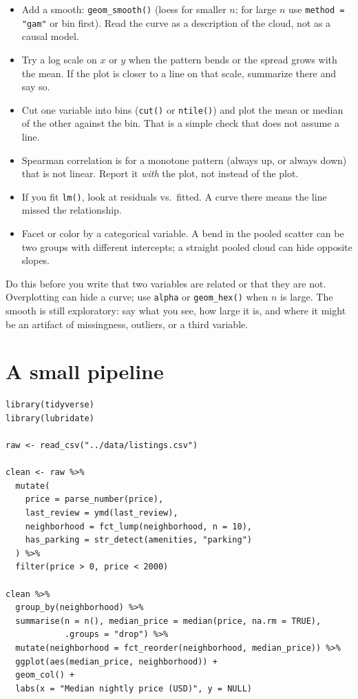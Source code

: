 \documentclass[11pt, a4paper]{article}
\begin{document}
\begin{itemize}
    \item Add a smooth: \texttt{geom\_smooth()} (loess for smaller $n$; for large $n$ use \texttt{method = "gam"} or bin first). Read the curve as a description of the cloud, not as a causal model.
    \item Try a log scale on $x$ or $y$ when the pattern bends or the spread grows with the mean. If the plot is closer to a line on that scale, summarize there and say so.
    \item Cut one variable into bins (\texttt{cut()} or \texttt{ntile()}) and plot the mean or median of the other against the bin. That is a simple check that does not assume a line.
    \item Spearman correlation is for a monotone pattern (always up, or always down) that is not linear. Report it \emph{with} the plot, not instead of the plot.
    \item If you fit \texttt{lm()}, look at residuals vs.\ fitted. A curve there means the line missed the relationship.
    \item Facet or color by a categorical variable. A bend in the pooled scatter can be two groups with different intercepts; a straight pooled cloud can hide opposite slopes.
\end{itemize}

Do this before you write that two variables are related or that they are not. Overplotting can hide a curve; use \texttt{alpha} or \texttt{geom\_hex()} when $n$ is large. The smooth is still exploratory: say what you see, how large it is, and where it might be an artifact of missingness, outliers, or a third variable.

\section*{A small pipeline}

\begin{lstlisting}
library(tidyverse)
library(lubridate)

raw <- read_csv("../data/listings.csv")

clean <- raw %>%
  mutate(
    price = parse_number(price),
    last_review = ymd(last_review),
    neighborhood = fct_lump(neighborhood, n = 10),
    has_parking = str_detect(amenities, "parking")
  ) %>%
  filter(price > 0, price < 2000)

clean %>%
  group_by(neighborhood) %>%
  summarise(n = n(), median_price = median(price, na.rm = TRUE),
            .groups = "drop") %>%
  mutate(neighborhood = fct_reorder(neighborhood, median_price)) %>%
  ggplot(aes(median_price, neighborhood)) +
  geom_col() +
  labs(x = "Median nightly price (USD)", y = NULL)
\end{lstlisting}
\end{document}
